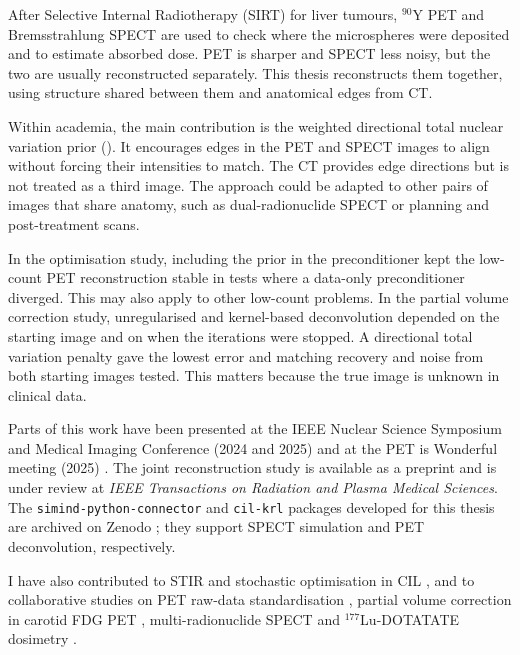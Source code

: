\begin{impactstatement}
After Selective Internal Radiotherapy (SIRT) for liver tumours, $^{90}$Y PET and Bremsstrahlung SPECT are used to check where the microspheres were deposited and to estimate absorbed dose. PET is sharper and SPECT less noisy, but the two are usually reconstructed separately. This thesis reconstructs them together, using structure shared between them and anatomical edges from CT.

Within academia, the main contribution is the weighted directional total nuclear variation prior (\wdtnv). It encourages edges in the PET and SPECT images to align without forcing their intensities to match. The CT provides edge directions but is not treated as a third image. The approach could be adapted to other pairs of images that share anatomy, such as dual-radionuclide SPECT or planning and post-treatment scans.

In the optimisation study, including the prior in the preconditioner kept the low-count PET reconstruction stable in tests where a data-only preconditioner diverged. This may also apply to other low-count problems. In the partial volume correction study, unregularised and kernel-based deconvolution depended on the starting image and on when the iterations were stopped. A directional total variation penalty gave the lowest error and matching recovery and noise from both starting images tested. This matters because the true image is unknown in clinical data.

Parts of this work have been presented at the IEEE Nuclear Science Symposium and Medical Imaging Conference (2024 and 2025) \cite{porterOptimisingSubsetSelection2024a,porterSynergisticPETSPECT2025,porterRegularisedRichardsonLucy2025} and at the PET is Wonderful meeting (2025) \cite{porterSimultaneousMultiBedMAP2025}. The joint reconstruction study is available as a preprint \cite{porterWeightedDirectionalTotal2026} and is under review at \emph{IEEE Transactions on Radiation and Plasma Medical Sciences}. The \texttt{simind-python-connector} and \texttt{cil-krl} packages developed for this thesis are archived on Zenodo \cite{porterSimindPythonConnector2026,porterCilKrl2026}; they support SPECT simulation and PET deconvolution, respectively.

I have also contributed to STIR \cite{efthimiouStirSoftware2024} and stochastic optimisation in CIL \cite{papoutsellisModularStochasticOptimisation2026}, and to collaborative studies on PET raw-data standardisation \cite{karakatsanisPetsirdHackathon2025}, partial volume correction in carotid FDG PET \cite{algodayanPartialVolumeCarotid2024}, multi-radionuclide SPECT \cite{strugariPreclinicalSpectralUnmixing2026} and $^{177}$Lu-DOTATATE dosimetry \cite{varzakisOpenSourceDosimetry2025}.


\end{impactstatement}

